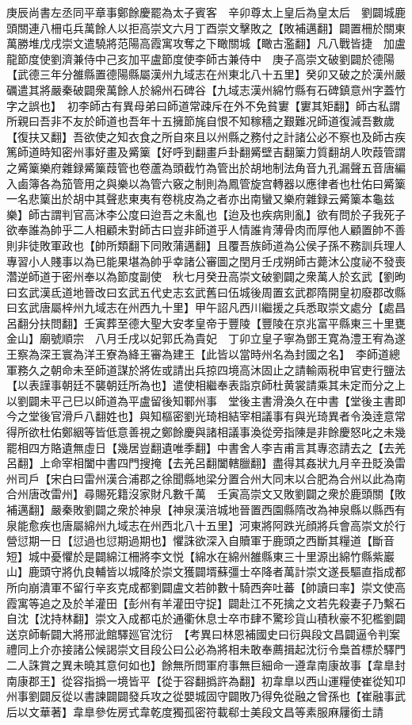 庚辰尚書左丞同平章事鄭餘慶罷為太子賓客　辛卯尊太上皇后為皇太后　劉闢城鹿頭關連八柵屯兵萬餘人以拒高崇文六月丁酉崇文擊敗之【敗補邁翻】闢置柵於關東萬勝堆戊戌崇文遣驍將范陽高霞寓攻奪之下瞰關城【瞰古濫翻】凡八戰皆捷　加盧龍節度使劉濟兼侍中己亥加平盧節度使李師古兼侍中　庚子高崇文破劉闢於德陽【武德三年分雒縣置德陽縣屬漢州九域志在州東北八十五里】癸卯又破之於漢州嚴礪遣其將嚴秦破闢衆萬餘人於綿州石碑谷【九域志漢州綿竹縣有石碑鎮意州字蓋竹字之誤也】　初李師古有異母弟曰師道常疎斥在外不免貧寠【寠其矩翻】師古私謂所親曰吾非不友於師道也吾年十五擁節旄自恨不知稼穡之艱難况師道復減吾數歲【復扶又翻】吾欲使之知衣食之所自來且以州縣之務付之計諸公必不察也及師古疾篤師道時知密州事好畫及觱篥【好呼到翻畫戶卦翻觱壁吉翻篥力質翻胡人吹葭管謂之觱篥樂府雜録觱篥葭管也卷蘆為頭截竹為管出於胡地制法角音九孔漏聲五音唐編入鹵簿各為笳管用之與樂以為管六竅之制則為鳳管旋宫轉器以應律者也杜佑曰觱篥一名悲篥出於胡中其聲悲東夷有卷桃皮為之者亦出南蠻又樂府雜録云觱篥本龜兹樂】師古謂判官高沐李公度曰迨吾之未亂也【迨及也疾病則亂】欲有問於子我死子欲奉誰為帥乎二人相顧未對師古曰豈非師道乎人情誰肯薄骨肉而厚他人顧置帥不善則非徒敗軍政也【帥所類翻下同敗蒲邁翻】且覆吾族師道為公侯子孫不務訓兵理人專習小人賤事以為已能果堪為帥乎幸諸公審圖之閏月壬戌朔師古薨沐公度祕不發喪濳逆師道于密州奉以為節度副使　秋七月癸丑高崇文破劉闢之衆萬人於玄武【劉昫曰玄武漢氐道地晉改曰玄武五代史志玄武舊曰伍城後周置玄武郡隋開皇初廢郡改縣曰玄武唐屬梓州九域志在州西九十里】甲午詔凡西川繼援之兵悉取崇文處分【處昌呂翻分扶問翻】壬寅葬至德大聖大安孝皇帝于豐陵【豐陵在京兆富平縣東三十里甕金山】廟號順宗　八月壬戌以妃郭氏為貴妃　丁卯立皇子寧為鄧王寛為澧王宥為遂王察為深王寰為洋王寮為絳王審為建王【此皆以當時州名為封國之名】　李師道總軍務久之朝命未至師道謀於將佐或請出兵掠四境高沐固止之請輸兩税申官吏行鹽法【以表謹事朝廷不襲朝廷所為也】遣使相繼奉表詣京師杜黄裳請乘其未定而分之上以劉闢未平己巳以師道為平盧留後知鄆州事　堂後主書滑渙久在中書【堂後主書即今之堂後官滑戶八翻姓也】與知樞密劉光琦相結宰相議事有與光琦異者令渙逹意常得所欲杜佑鄭絪等皆低意善視之鄭餘慶與諸相議事渙從旁指陳是非餘慶怒叱之未幾罷相四方賂遺無虛日【幾居豈翻遺唯季翻】中書舍人李吉甫言其專恣請去之【去羌呂翻】上命宰相闔中書四門搜掩【去羌呂翻闔轄臘翻】盡得其姦狀九月辛丑貶渙雷州司戶【宋白曰雷州漢合浦郡之徐聞縣地梁分置合州大同末以合肥為合州以此為南合州唐改雷州】尋賜死籍沒家財凡數千萬　壬寅高崇文又敗劉闢之衆於鹿頭關【敗補邁翻】嚴秦敗劉闢之衆於神泉【神泉漢涪城地晉置西園縣隋改為神泉縣以縣西有泉能愈疾也唐屬綿州九域志在州西北八十五里】河東將阿跌光顔將兵會高崇文於行營愆期一日【愆過也愆期過期也】懼誅欲深入自贖軍于鹿頭之西斷其糧道【斷音短】城中憂懼於是闢綿江柵將李文悦【綿水在綿州雒縣東三十里源出綿竹縣紫巖山】鹿頭守將仇良輔皆以城降於崇文獲闢壻蘇彊士卒降者萬計崇文遂長驅直指成都所向崩潰軍不留行辛亥克成都劉闢盧文若帥數十騎西奔吐蕃【帥讀曰率】崇文使高霞寓等追之及於羊灌田【彭州有羊灌田守捉】闢赴江不死擒之文若先殺妻子乃繫石自沈【沈持林翻】崇文入成都屯於通衢休息士卒市肆不驚珍貨山積秋豪不犯檻劉闢送京師斬闢大將邢泚館驛廵官沈衍　【考異曰林恩補國史曰衍與段文昌闢逼令判案禮同上介亦接諸公候謁崇文目段公曰公必為將相未敢奉薦揖起沈衍令梟首標於驛門二人誅賞之異未曉其意何如也】餘無所問軍府事無巨細命一遵韋南康故事【韋臯封南康郡王】從容指撝一境皆平【從于容翻撝許為翻】初韋臯以西山運糧使崔從知卭州事劉闢反從以書諫闢闢發兵攻之從嬰城固守闢敗乃得免從融之曾孫也【崔融事武后以文華著】韋臯參佐房式韋乾度獨孤密符載郗士美段文昌等素服麻屨銜土請